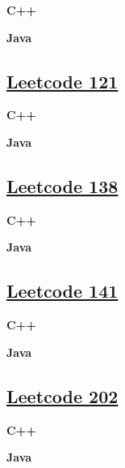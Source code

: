 \textbf{C++}\par


\textbf{Java}\par



\subsection{\href{https://leetcode-cn.com/}{Leetcode 121}}\label{app:codelist:leetcode:121}

\textbf{C++}\par


\textbf{Java}\par



\subsection{\href{https://leetcode-cn.com/}{Leetcode 138}}\label{app:codelist:leetcode:138}

\textbf{C++}\par


\textbf{Java}\par



\subsection{\href{https://leetcode-cn.com/}{Leetcode 141}}\label{app:codelist:leetcode:141}

\textbf{C++}\par


\textbf{Java}\par



\subsection{\href{https://leetcode-cn.com/}{Leetcode 202}}\label{app:codelist:leetcode:202}

\textbf{C++}\par


\textbf{Java}\par



